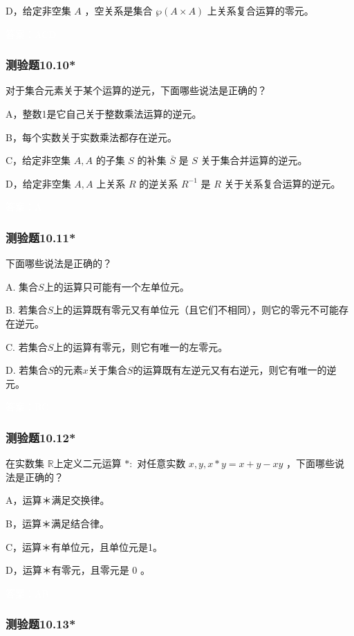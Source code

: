 \documentclass[UTF8, heading=true]{ctexart}
\begin{document}
D，给定非空集 $A$ ，空关系是集合 $\wp(A \times A)$ 上关系复合运算的零元。

\textcolor{white}{答案：ACD}

\subsubsection{测验题10.10*}


对于集合元素关于某个运算的逆元，下面哪些说法是正确的？

A，整数1是它自己关于整数乘法运算的逆元。

B，每个实数关于实数乘法都存在逆元。

C，给定非空集 $A, A$ 的子集 $S$ 的补集 $\bar{S}$ 是 $S$ 关于集合并运算的逆元。

D，给定非空集 $A, A$ 上关系 $R$ 的逆关系 $R^{-1}$ 是 $R$ 关于关系复合运算的逆元。

\textcolor{white}{答案：A}

\subsubsection{测验题10.11*}

下面哪些说法是正确的？

A. 集合$S$上的运算只可能有一个左单位元。

B.
若集合$S$上的运算既有零元又有单位元（且它们不相同），则它的零元不可能存在逆元。

C. 若集合$S$上的运算有零元，则它有唯一的左零元。

D. 若集合$S$的元素$x$关于集合$S$的运算既有左逆元又有右逆元，则它有唯一的逆元。

\textcolor{white}{答案：BC}


\subsubsection{测验题10.12*}

在实数集 $\mathbb{R}$上定义二元运算 $*:$ 对任意实数 $x, y, x * y=x+y-x y$ ，下面哪些说法是正确的？

A，运算＊满足交换律。

B，运算＊满足结合律。

C，运算＊有单位元，且单位元是1。

D，运算＊有零元，且零元是 0 。


\textcolor{white}{答案：AB}

\subsubsection{测验题10.13*}
\end{document}
